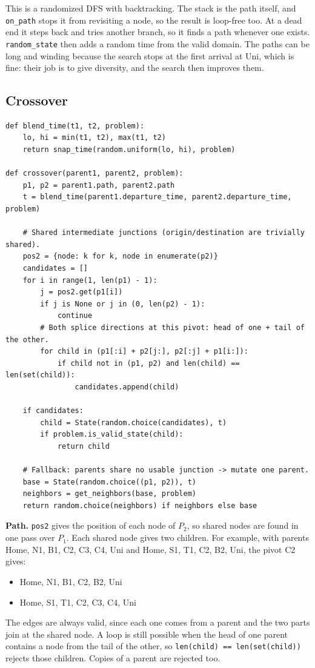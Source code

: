 \documentclass[11pt,a4paper]{article}
\newcommand{\col}[1]{\texttt{#1}}
\begin{document}
\noindent This is a randomized DFS with backtracking. The stack is the path itself, and \col{on\_path}
stops it from revisiting a node, so the result is loop-free too. At a dead end it steps back and tries
another branch, so it finds a path whenever one exists. \col{random\_state} then adds a random time
from the valid domain. The paths can be long and winding because the search stops at the first arrival
at Uni, which is fine: their job is to give diversity, and the search then improves them.

\subsection{Crossover}

\begin{lstlisting}
def blend_time(t1, t2, problem):
    lo, hi = min(t1, t2), max(t1, t2)
    return snap_time(random.uniform(lo, hi), problem)

def crossover(parent1, parent2, problem):
    p1, p2 = parent1.path, parent2.path
    t = blend_time(parent1.departure_time, parent2.departure_time, problem)

    # Shared intermediate junctions (origin/destination are trivially shared).
    pos2 = {node: k for k, node in enumerate(p2)}
    candidates = []
    for i in range(1, len(p1) - 1):
        j = pos2.get(p1[i])
        if j is None or j in (0, len(p2) - 1):
            continue
        # Both splice directions at this pivot: head of one + tail of the other.
        for child in (p1[:i] + p2[j:], p2[:j] + p1[i:]):
            if child not in (p1, p2) and len(child) == len(set(child)):
                candidates.append(child)

    if candidates:
        child = State(random.choice(candidates), t)
        if problem.is_valid_state(child):
            return child

    # Fallback: parents share no usable junction -> mutate one parent.
    base = State(random.choice((p1, p2)), t)
    neighbors = get_neighbors(base, problem)
    return random.choice(neighbors) if neighbors else base
\end{lstlisting}

\noindent\textbf{Path.} \col{pos2} gives the position of each node of $P_2$, so shared nodes are found
in one pass over $P_1$. Each shared node gives two children. For example, with parents Home, N1, B1,
C2, C3, C4, Uni and Home, S1, T1, C2, B2, Uni, the pivot C2 gives:
\begin{itemize}
  \item Home, N1, B1, C2, B2, Uni
  \item Home, S1, T1, C2, C3, C4, Uni
\end{itemize}
The edges are always valid, since each one comes from a parent and the two parts join at the shared
node. A loop is still possible when the head of one parent contains a node from the tail of the other,
so \col{len(child) == len(set(child))} rejects those children. Copies of a parent are rejected too.
\end{document}
